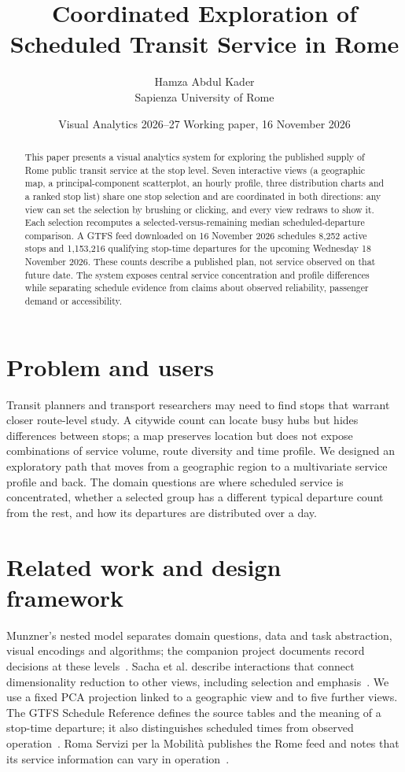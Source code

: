 \documentclass[10pt,a4paper]{article}
\title{Coordinated Exploration of Scheduled Transit Service in Rome}
\author{Hamza Abdul Kader\\Sapienza University of Rome}
\date{Visual Analytics 2026--27 \quad Working paper, 16 November 2026}
\begin{document}
\maketitle
\begin{abstract}
This paper presents a visual analytics system for exploring the published supply of Rome public transit service at the stop level. Seven interactive views (a geographic map, a principal-component scatterplot, an hourly profile, three distribution charts and a ranked stop list) share one stop selection and are coordinated in both directions: any view can set the selection by brushing or clicking, and every view redraws to show it. Each selection recomputes a selected-versus-remaining median scheduled-departure comparison. A GTFS feed downloaded on 16 November 2026 schedules 8,252 active stops and 1,153,216 qualifying stop-time departures for the upcoming Wednesday 18 November 2026. These counts describe a published plan, not service observed on that future date. The system exposes central service concentration and profile differences while separating schedule evidence from claims about observed reliability, passenger demand or accessibility.
\end{abstract}

\section{Problem and users}
Transit planners and transport researchers may need to find stops that warrant closer route-level study. A citywide count can locate busy hubs but hides differences between stops; a map preserves location but does not expose combinations of service volume, route diversity and time profile. We designed an exploratory path that moves from a geographic region to a multivariate service profile and back. The domain questions are where scheduled service is concentrated, whether a selected group has a different typical departure count from the rest, and how its departures are distributed over a day.

\section{Related work and design framework}
Munzner's nested model separates domain questions, data and task abstraction, visual encodings and algorithms; the companion project documents record decisions at these levels~\cite{munzner}. Sacha et al. describe interactions that connect dimensionality reduction to other views, including selection and emphasis~\cite{sacha}. We use a fixed PCA projection linked to a geographic view and to five further views. The GTFS Schedule Reference defines the source tables and the meaning of a stop-time departure; it also distinguishes scheduled times from observed operation~\cite{gtfs}. Roma Servizi per la Mobilit\`a publishes the Rome feed and notes that its service information can vary in operation~\cite{rsm}.
\end{document}
